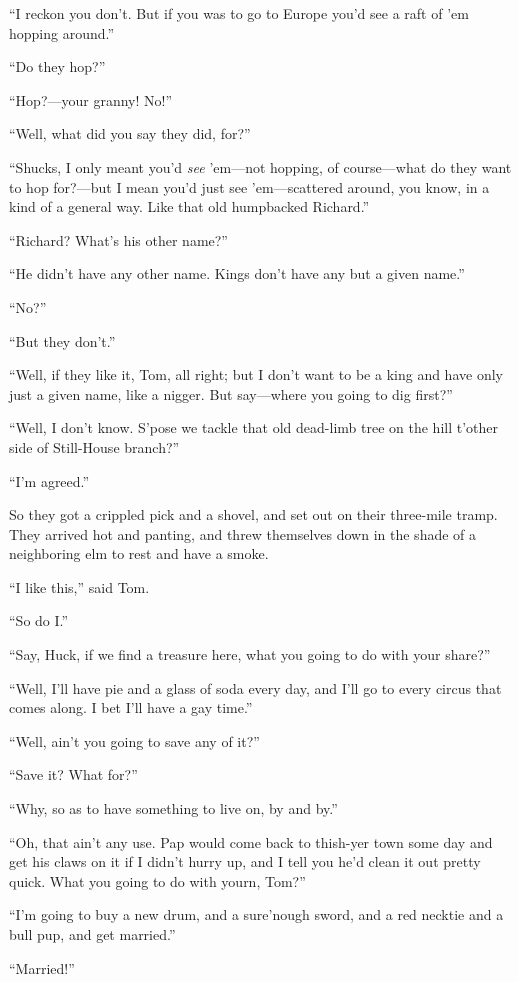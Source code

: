 \documentclass{book}
\begin{document}
“I reckon you don’t. But if you was to go to Europe you’d see a raft of ’em hopping around.”

“Do they hop?”

“Hop?—your granny! No!”

“Well, what did you say they did, for?”

“Shucks, I only meant you’d \emph{see} ’em—not hopping, of course—what do they want to hop for?—but I mean you’d just see ’em—scattered around, you know, in a kind of a general way. Like that old humpbacked Richard.”

“Richard? What’s his other name?”

“He didn’t have any other name. Kings don’t have any but a given name.”

“No?”

“But they don’t.”

“Well, if they like it, Tom, all right; but I don’t want to be a king and have only just a given name, like a nigger. But say—where you going to dig first?”

“Well, I don’t know. S’pose we tackle that old dead-limb tree on the hill t’other side of Still-House branch?”

“I’m agreed.”

So they got a crippled pick and a shovel, and set out on their three-mile tramp. They arrived hot and panting, and threw themselves down in the shade of a neighboring elm to rest and have a smoke.

“I like this,” said Tom.

“So do I.”

“Say, Huck, if we find a treasure here, what you going to do with your share?”

“Well, I’ll have pie and a glass of soda every day, and I’ll go to every circus that comes along. I bet I’ll have a gay time.”

“Well, ain’t you going to save any of it?”

“Save it? What for?”

“Why, so as to have something to live on, by and by.”

“Oh, that ain’t any use. Pap would come back to thish-yer town some day and get his claws on it if I didn’t hurry up, and I tell you he’d clean it out pretty quick. What you going to do with yourn, Tom?”

“I’m going to buy a new drum, and a sure’nough sword, and a red necktie and a bull pup, and get married.”

“Married!”
\end{document}
